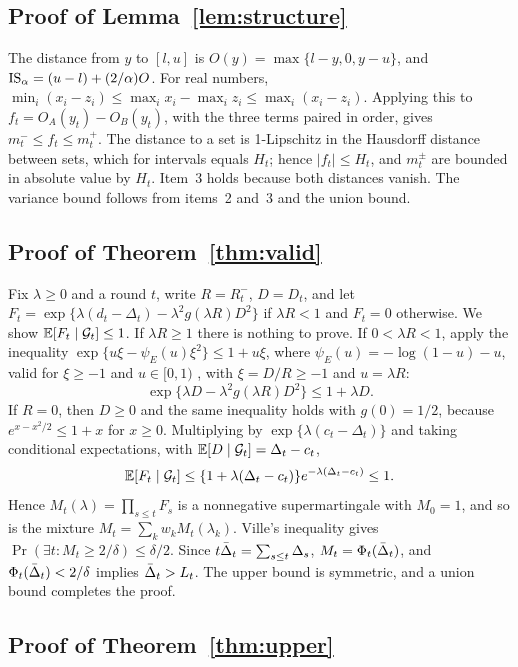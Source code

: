 \subsection{Proof of Lemma~\ref{lem:structure}}

The distance from $y$ to $[l,u]$ is $O(y)=\max\{l-y,0,y-u\}$, and
$\mathrm{IS}_\alpha=(u-l)+(2/\alpha)O$. For real numbers,
$\min_i(x_i-z_i)\le\max_ix_i-\max_iz_i\le\max_i(x_i-z_i)$. Applying this
to $f_t=O_A(y_t)-O_B(y_t)$, with the three terms paired in order, gives
$m_t^-\le f_t\le m_t^+$. The distance to a set is 1-Lipschitz in the
Hausdorff distance between sets, which for intervals equals $H_t$; hence
$|f_t|\le H_t$, and $m_t^\pm$ are bounded in absolute value by $H_t$.
Item~3 holds because both distances vanish. The variance bound follows from
items~2 and~3 and the union bound.

\subsection{Proof of Theorem~\ref{thm:valid}}

Fix $\lambda\ge0$ and a round $t$, write $R=R^-_t$, $D=D_t$, and let
$F_t=\exp\{\lambda(d_t-\Delta_t)-\lambda^2g(\lambda R)D^2\}$ if
$\lambda R<1$ and $F_t=0$ otherwise. We show $\mathbb{E}[F_t\mid\mathcal{G}_t]\le1$. If
$\lambda R\ge1$ there is nothing to prove. If $0<\lambda R<1$, apply the
inequality $\exp\{u\xi-\psi_E(u)\xi^2\}\le1+u\xi$, where
$\psi_E(u)=-\log(1-u)-u$, valid for $\xi\ge-1$ and $u\in[0,1)$
\citep{fan2015exponential}, with $\xi=D/R\ge-1$ and $u=\lambda R$:
\[
 \exp\{\lambda D-\lambda^2g(\lambda R)D^2\}\le1+\lambda D .
\]
If $R=0$, then $D\ge0$ and the same inequality holds with $g(0)=1/2$,
because $e^{x-x^2/2}\le1+x$ for $x\ge0$. Multiplying by
$\exp\{\lambda(c_t-\Delta_t)\}$ and taking conditional expectations, with
$\mathbb{E}[D\mid\mathcal{G}_t]=\Delta_t-c_t$,
\[
 \mathbb{E}[F_t\mid\mathcal{G}_t]\le\{1+\lambda(\Delta_t-c_t)\}e^{-\lambda(\Delta_t-c_t)}\le1 .
\]
Hence $M_t(\lambda)=\prod_{s\le t}F_s$ is a nonnegative supermartingale with
$M_0=1$, and so is the mixture $M_t=\sum_kw_kM_t(\lambda_k)$. Ville's
inequality \citep{ville1939etude} gives
$\Pr(\exists t:M_t\ge2/\delta)\le\delta/2$. Since
$t\bar\Delta_t=\sum_{s\le t}\Delta_s$, $M_t=\Phi_t(\bar\Delta_t)$, and
$\Phi_t(\bar\Delta_t)<2/\delta$ implies $\bar\Delta_t>L_t$. The upper bound is
symmetric, and a union bound completes the proof.

\subsection{Proof of Theorem~\ref{thm:upper}}
\label{app:upper}

